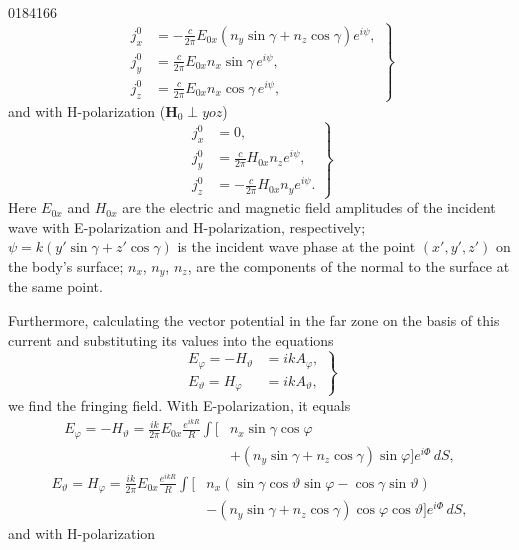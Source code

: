 \begin{scanpage}{0184}{166}
\[
\left.\begin{aligned}j_x^0&=-\frac c{2\pi}E_{0x}(n_y\sin\gamma+n_z\cos\gamma)e^{i\psi},\\
j_y^0&=\frac c{2\pi}E_{0x}n_x\sin\gamma\,e^{i\psi},\\
j_z^0&=\frac c{2\pi}E_{0x}n_x\cos\gamma\,e^{i\psi},
\end{aligned}\right\}\tag{26.07}
\]
and with H-polarization ($\mathbf H_0\perp yoz$)
\[
\left.\begin{aligned}j_x^0&=0,\\j_y^0&=\frac c{2\pi}H_{0x}n_ze^{i\psi},\\j_z^0&=-\frac c{2\pi}H_{0x}n_ye^{i\psi}.
\end{aligned}\right\}\tag{26.08}
\]
Here $E_{0x}$ and $H_{0x}$ are the electric and magnetic field amplitudes of the incident wave with E-polarization and H-polarization, respectively; $\psi=k(y'\sin\gamma+z'\cos\gamma)$ is the incident wave phase at the point $(x',y',z')$ on the body's surface; $n_x$, $n_y$, $n_z$, are the components of the normal to the surface at the same point.

Furthermore, calculating the vector potential in the far zone on the basis of this current and substituting its values into the equations
\[
\left.\begin{aligned}E_\varphi=-H_\vartheta&=ikA_\varphi,\\E_\vartheta=H_\varphi&=ikA_\vartheta,
\end{aligned}\right\}\tag{26.09}
\]
we find the fringing field. With E-polarization, it equals
\[
\begin{aligned}E_\varphi=-H_\vartheta=\frac{ik}{2\pi}E_{0x}\frac{e^{ikR}}R\int[&n_x\sin\gamma\cos\varphi\\&+(n_y\sin\gamma+n_z\cos\gamma)\sin\varphi]e^{i\Phi}\,dS,
\end{aligned}\tag{26.10}
\]
\[
\begin{aligned}E_\vartheta=H_\varphi=\frac{ik}{2\pi}E_{0x}\frac{e^{ikR}}R\int[&n_x(\sin\gamma\cos\vartheta\sin\varphi-\cos\gamma\sin\vartheta)\\&-(n_y\sin\gamma+n_z\cos\gamma)\cos\varphi\cos\vartheta]e^{i\Phi}\,dS,
\end{aligned}\tag{26.10}
\]
and with H-polarization
\end{scanpage}
